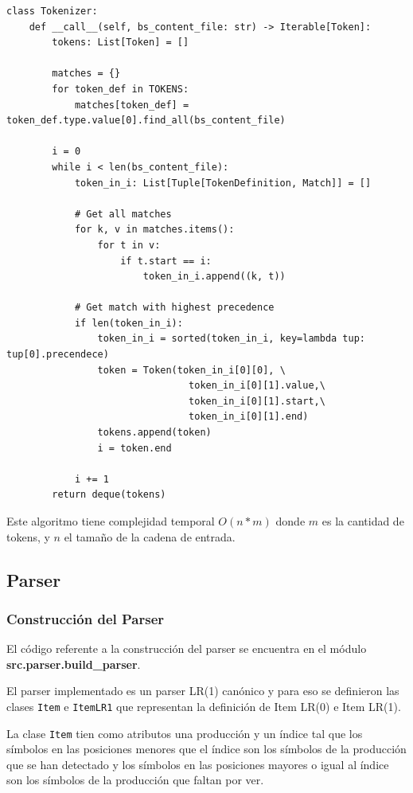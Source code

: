 \begin{verbatim}
class Tokenizer:
    def __call__(self, bs_content_file: str) -> Iterable[Token]:
        tokens: List[Token] = []

        matches = {}
        for token_def in TOKENS:
            matches[token_def] = token_def.type.value[0].find_all(bs_content_file)
        
        i = 0
        while i < len(bs_content_file):
            token_in_i: List[Tuple[TokenDefinition, Match]] = []

            # Get all matches
            for k, v in matches.items():
                for t in v:
                    if t.start == i:
                        token_in_i.append((k, t))
                    
            # Get match with highest precedence
            if len(token_in_i):
                token_in_i = sorted(token_in_i, key=lambda tup: tup[0].precendece)
                token = Token(token_in_i[0][0], \
                                token_in_i[0][1].value,\
                                token_in_i[0][1].start,\
                                token_in_i[0][1].end)
                tokens.append(token)    
                i = token.end

            i += 1
        return deque(tokens)
\end{verbatim}

Este algoritmo tiene complejidad temporal $O(n*m)$ donde $m$ es la cantidad de tokens, y $n$ el tamaño de la cadena de entrada.

\subsection{Parser}

\subsubsection{Construcci\'on del Parser}

El c\'odigo referente a la construcci\'on del parser se encuentra en el m\'odulo \textbf{src.parser.build\_parser}.

El parser implementado es un parser LR(1) can\'onico y para eso se definieron las clases \verb|Item| e \verb|ItemLR1| que representan la definici\'on de Item LR(0) e Item LR(1).

La clase \verb|Item| tien como atributos una producci\'on y un \'indice tal que los s\'imbolos en las posiciones menores que el \'indice son los s\'imbolos de la producci\'on que se han detectado y los s\'imbolos en las posiciones mayores o igual al \'indice son los s\'imbolos de la producci\'on que faltan por ver.

